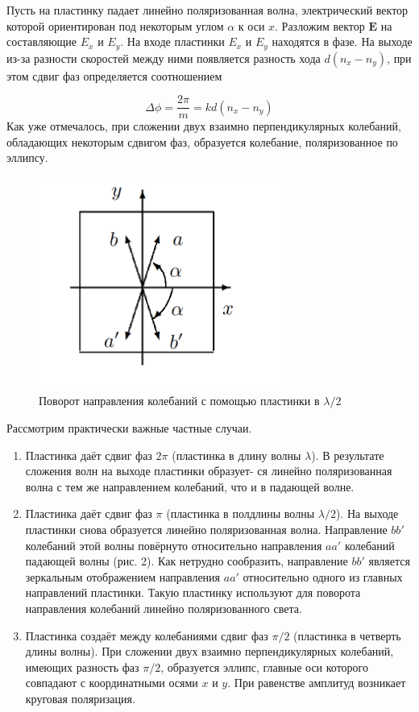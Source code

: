 \documentclass[15pt,a5paper,reqno]{article}
\begin{document}
Пусть на пластинку падает линейно поляризованная волна, электрический вектор которой ориентирован под некоторым углом $ \alpha $ к оси
$ x $. Разложим вектор $ \mathbf{E} $ на составляющие $ E_x $ и $ E_y $. На входе пластинки $ E_x $ и $ E_y $ находятся в фазе. На выходе из-за разности скоростей между ними появляется разность хода $ d(n_x - n_y) $, при этом сдвиг фаз определяется соотношением

\begin{equation}\label{}
\Delta \phi =  \dfrac{2\pi}{m} = k d(n_x - n_y)
\end{equation}
Как уже отмечалось, при сложении двух взаимно перпендикулярных колебаний, обладающих некоторым сдвигом фаз, образуется колебание, поляризованное по эллипсу.


\begin{figure}[h!]
    \centering
    \includegraphics[width=8cm]{pics/2.png}
    \caption{Поворот направления колебаний с помощью пластинки в $ \lambda / 2 $}
    \label{fig:vac}
\end{figure}


Рассмотрим практически важные частные случаи.

 \begin{enumerate}

 	\item Пластинка даёт сдвиг фаз $ 2\pi $ (пластинка в длину волны $ \lambda $). В результате сложения волн на выходе пластинки образует-
ся линейно поляризованная волна с тем же направлением колебаний, что и в падающей волне.

	\item Пластинка даёт сдвиг фаз $ \pi $ (пластинка в полдлины волны $ \lambda / 2 $). На выходе пластинки снова образуется линейно поляризованная волна. Направление $ bb' $ колебаний этой волны повёрнуто относительно направления $ aa' $ колебаний падающей волны (рис. 2). Как нетрудно сообразить, направление $ bb' $ является зеркальным отображением направления $ aa' $ относительно одного из главных направлений пластинки. Такую пластинку используют для поворота направления колебаний линейно поляризованного света.

	\item Пластинка создаёт между колебаниями сдвиг фаз $ \pi/2 $ (пластинка
в четверть длины волны). При сложении двух взаимно перпендикулярных колебаний, имеющих разность фаз $ \pi/2 $, образуется эллипс, главные оси которого совпадают с координатными осями $ x $ и $ y $. При равенстве амплитуд возникает круговая поляризация.

 \end{enumerate}
\end{document}
